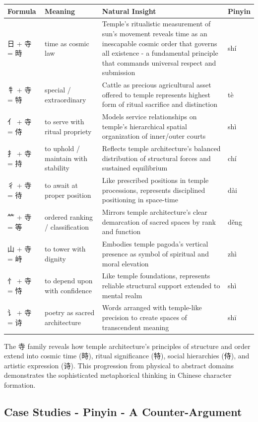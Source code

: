 \documentclass[11pt,letterpaper]{article}
\begin{document}
\begin{longtable}{|p{3cm}|p{3cm}|p{6cm}|p{2cm}|}
\hline
\textbf{Formula} & \textbf{Meaning} & \textbf{Natural Insight} & \textbf{Pinyin} \\
\hline
日 + 寺 = 時 & time as cosmic law & Temple's ritualistic measurement of
sun's movement reveals time as an inescapable cosmic order that governs
all existence - a fundamental principle that commands universal respect
and submission & shí \\
\hline
牜 + 寺 = 特 & special / extraordinary & Cattle as precious agricultural
asset offered to temple represents highest form of ritual sacrifice and
distinction & tè \\
\hline
亻 + 寺 = 侍 & to serve with ritual propriety & Models service
relationships on temple's hierarchical spatial organization of
inner/outer courts & shì \\
\hline
扌 + 寺 = 持 & to uphold / maintain with stability & Reflects temple
architecture's balanced distribution of structural forces and sustained
equilibrium & chí \\
\hline
彳 + 寺 = 待 & to await at proper position & Like prescribed positions
in temple processions, represents disciplined positioning in space-time
& dài \\
\hline
⺮ + 寺 = 等 & ordered ranking / classification & Mirrors temple
architecture's clear demarcation of sacred spaces by rank and function &
děng \\
\hline
山 + 寺 = 峙 & to tower with dignity & Embodies temple pagoda's vertical
presence as symbol of spiritual and moral elevation & zhì \\
\hline
忄 + 寺 = 恃 & to depend upon with confidence & Like temple foundations,
represents reliable structural support extended to mental realm & shì \\
\hline
讠 + 寺 = 诗 & poetry as sacred architecture & Words arranged with
temple-like precision to create spaces of transcendent meaning & shī \\
\hline
\end{longtable}



The 寺 family reveals how temple architecture's principles of structure
and order extend into cosmic time (時), ritual significance (特), social
hierarchies (侍), and artistic expression (诗). This progression from
physical to abstract domains demonstrates the sophisticated metaphorical
thinking in Chinese character formation.

\subsection{Case Studies - Pinyin - A
Counter-Argument}\label{case-studies---pinyin---a-counter-argument}
\end{document}
